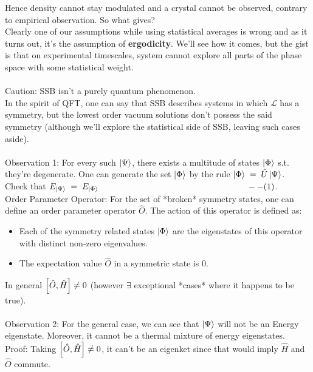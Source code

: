 \documentclass[12pt]{article}
\begin{document}
Hence density cannot stay modulated and a crystal cannot be observed, contrary to empirical observation. So what gives?\\
Clearly one of our assumptions while using statistical averages is wrong and as it turns out, it's the assumption of \textbf{ergodicity}. We'll see how it comes, but the gist is that on experimental timescales, system cannot explore all parts of the phase space with some statistical weight.\\
\\
Caution: SSB isn't a purely quantum phenomenon.\\
\newline
In the spirit of QFT, one can say that SSB describes systems in which $\mathcal{L}$ has a symmetry, but the lowest order vacuum solutions don't possess the said symmetry (although we'll explore the statistical side of SSB, leaving such cases aside).\\
\\
Observation 1: For every such $\ket{\Psi}$, there exists a multitude of states $\ket{\Phi}$ s.t. they're degenerate.
One can generate the set {$\ket{\Phi}$} by the rule $\ket{\Phi}\;=\;\hat{U}\ket{\Psi}$.\\
Check that $E_{\ket{\Psi}}\;=\;E_{\ket{\Phi}}\;\;\;\;\;\;\;\;\;\;\;\;\;\;\;\;\;\;\;\;\;\;\;\;\;\;\;\;\;\;\;\;\;\;\;\;\;\;\;\;\;\;\;\;\;\;\;\;\;\;\;\;\;\;\;\;\;\;\;\;\;\;\;--(1)$.\\
\newline
Order Parameter Operator: For the set of *broken* symmetry states, one can define an order parameter operator $\hat{O}$.
The action of this operator is defined as:
\begin{itemize}
    \item
        Each of the symmetry related states {$\ket{\Phi}$} are the eigenstates of this operator with distinct non-zero eigenvalues.
    \item The expectation value $\hat{O}$ in a symmetric state is 0.
\end{itemize}
In general $\comm{\hat{O}}{\hat{H}}\neq 0$ (however $\exists$ exceptional *cases* where it happens to be true).\\
\\
Observation 2: For the general case, we can see that $\ket{\Psi}$ will not be an Energy eigenstate. Moreover, it cannot be a thermal mixture of energy eigenstates.\\
Proof: Taking $\comm{\hat{O}}{\hat{H}}\neq 0$, it can't be an eigenket since that would imply $\hat{H}$ and $\hat{O}$ commute.
\end{document}
